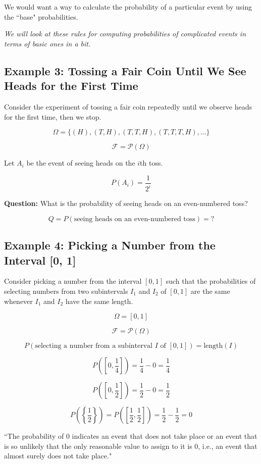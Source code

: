 \documentclass{article}
\begin{document}
We would want a way to calculate the probability of a particular event by using the ``base" probabilities.

\textit{We will look at these rules for computing probabilities of complicated events in terms of basic ones in a bit.}

\subsection*{Example 3: Tossing a Fair Coin Until We See Heads for the First Time}
Consider the experiment of tossing a fair coin repeatedly until we observe heads for the first time, then we stop.

\[
\Omega = \{(H), (T, H), (T, T, H), (T, T, T, H), \ldots\}
\]

\[
\mathcal{F} = \mathcal{P}(\Omega)
\]

Let \(A_i\) be the event of seeing heads on the \(i\)th toss.

\[
P(A_i) = \frac{1}{2^i}
\]

\textbf{Question:} What is the probability of seeing heads on an even-numbered toss?

\[
Q = P(\text{seeing heads on an even-numbered toss}) = ?
\]

\subsection*{Example 4: Picking a Number from the Interval [0, 1]}
Consider picking a number from the interval \([0, 1]\) such that the probabilities of selecting numbers from two subintervals \(I_1\) and \(I_2\) of \([0, 1]\) are the same whenever \(I_1\) and \(I_2\) have the same length.

\[
\Omega = [0, 1]
\]

\[
\mathcal{F} = \mathcal{P}(\Omega)
\]

\[
P(\text{selecting a number from a subinterval } I \text{ of } [0, 1]) = \text{length}(I)
\]

\[
P([0, \frac{1}{4}]) = \frac{1}{4} - 0 = \frac{1}{4}
\]

\[
P([0, \frac{1}{2}]) = \frac{1}{2} - 0 = \frac{1}{2}
\]

\[
P\left(\left\{\frac{1}{2}\right\}\right) = P\left(\left[\frac{1}{2}, \frac{1}{2}\right]\right) = \frac{1}{2} - \frac{1}{2} = 0
\]

``The probability of 0 indicates an event that does not take place or an event that is so unlikely that the only reasonable value to assign to it is 0, i.e., an event that almost surely does not take place."
\end{document}
